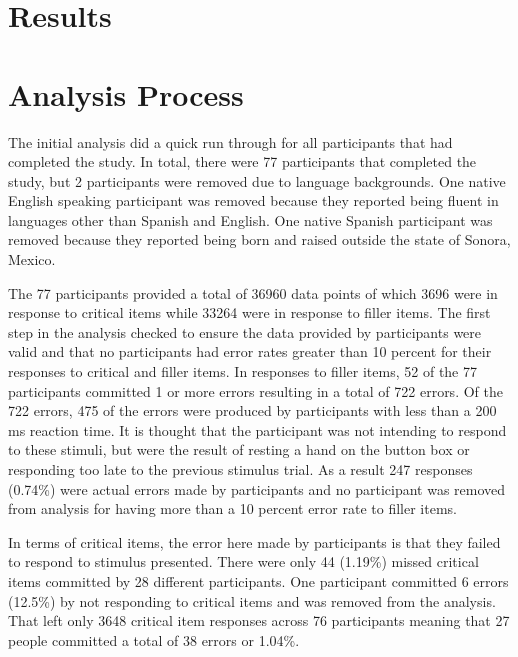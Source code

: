 \documentclass[
12pt, %
english, %
doublespacing, %
nolistspacing, %
liststotoc, %
headsepline, %
chapterinoneline, %
openany, %
]{DoctoralThesis}\usepackage[]{graphicx}\usepackage[]{color}
\begin{document}

\section{Results}
\section{Analysis Process}
The initial analysis did a quick run through for all participants that had completed the study. In total, there were 77 participants that completed the study, but 2 participants were removed due to language backgrounds. One native English speaking participant %
was removed because they reported being fluent in languages other than Spanish and English. One native Spanish participant %
was removed because they reported being born and raised outside the state of Sonora, Mexico. 

The 77 participants provided a total of 36960 data points of which 3696 were in response to critical items while 33264 were in response to filler items. The first step in the analysis checked to ensure the data provided by participants were valid and that no participants had error rates greater than 10 percent for their responses to critical and filler items. In responses to filler items, 52 of the 77 participants committed 1 or more errors resulting in a total of 722 errors. Of the 722 errors, 475 of the errors were produced by participants with less than a 200 ms reaction time. It is thought that the participant was not intending to respond to these stimuli, but were the result of resting a hand on the button box or responding too late to the previous stimulus trial. As a result 247 responses (0.74\%) were actual errors made by participants and no participant was removed from analysis for having more than a 10 percent error rate to filler items. %

In terms of critical items, the error here made by participants is that they failed to respond to stimulus presented. There were only 44 (1.19\%) missed critical items committed by 28 different participants. One participant %
committed 6 errors (12.5\%) by not responding to critical items and was removed from the analysis. That left only 3648 critical item responses across 76 participants meaning that 27 people committed a total of 38 errors or 1.04\%.
\end{document}
